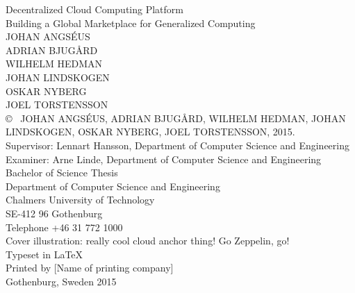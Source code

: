 \newpage
\thispagestyle{plain}
\vspace*{4.5cm}
\noindent Decentralized Cloud Computing Platform\\
Building a Global Marketplace for Generalized Computing\\
JOHAN ANGSÉUS\\
ADRIAN BJUGÅRD\\
WILHELM HEDMAN\\
JOHAN LINDSKOGEN\\
OSKAR NYBERG\\
JOEL TORSTENSSON\\[0.5cm]

\noindent \copyright ~ JOHAN ANGSÉUS, ADRIAN BJUGÅRD, WILHELM HEDMAN, JOHAN LINDSKOGEN, OSKAR NYBERG, JOEL TORSTENSSON, 2015.\\[0.5cm]

\noindent Supervisor: Lennart Hansson, Department of Computer Science and Engineering\\
Examiner: Arne Linde, Department of Computer Science and Engineering
\\[0.5cm]

\noindent Bachelor of Science Thesis\\
Department of Computer Science and Engineering\\
Chalmers University of Technology\\
SE-412 96 Gothenburg\\
Telephone +46 31 772 1000\\

\vfill
\noindent Cover illustration: really cool cloud anchor thing! Go Zeppelin, go! \\

\noindent Typeset in \LaTeX \\
Printed by [Name of printing company]\\
Gothenburg, Sweden 2015
